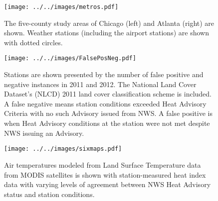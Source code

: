\documentclass{ametsoc}
\begin{document}
\begin{center}
\begin{figure}[t]
 \texttt{[image: ../../images/metros.pdf]}
  \caption{The five-county study areas of Chicago (left) and Atlanta (right) are shown. Weather stations (including the airport stations) are shown with dotted circles.}
   \label{fig:metros}
\end{figure}
\end{center}

\begin{center}
\begin{figure}[t]
 \texttt{[image: ../../images/FalsePosNeg.pdf]}
  \caption{Stations are shown presented by the number of false positive and negative instances in 2011 and 2012. The National Land Cover Dataset's (NLCD) 2011 land cover classification scheme is included. A false negative means station conditions exceeded Heat Advisory Criteria with no such Advisory issued from NWS. A false positive is when Heat Advisory conditions at the station were not met despite NWS issuing an Advisory.}
   \label{fig:FalsePosNeg}
\end{figure}
\end{center}


\begin{center}
\begin{figure}[t]
 \texttt{[image: ../../images/sixmaps.pdf]}
  \caption{Air temperatures modeled from Land Surface Temperature data from MODIS satellites is shown with station-measured heat index data with varying levels of agreement between NWS Heat Advisory status and station conditions. }
   \label{fig:LSTairTemps}
\end{figure}
\end{center}
\end{document}
